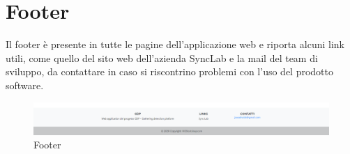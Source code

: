 \section{Footer}\label{UtilizzoDiGDPGatheringDetecionPlatformFooter}
Il footer è presente in tutte le pagine dell'applicazione web e riporta alcuni link utili, come quello del sito web dell'azienda SyncLab e la mail del team di sviluppo, da contattare in caso si riscontrino problemi con l'uso del prodotto software. 
\begin{center}
	\begin{figure}
		\includegraphics[width=1\linewidth]{../immagini/manualeUtente/Footer.png}
		\caption{Footer}
	\end{figure}
\end{center}


